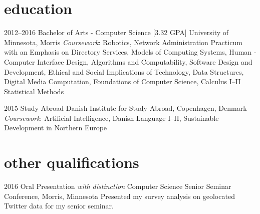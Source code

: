 \documentclass[]{cv-style} %
\begin{document}

\section{education}

\begin{entrylist}


\entry
{2012--2016}
{Bachelor {\normalfont of Arts - Computer Science [3.32 GPA]}}
{University of Minnesota, Morris}
{\emph{Coursework}: \footnotesize{Robotics, Network Administration Practicum with an Emphasis on Directory Services, Models of Computing Systems, Human ­Computer Interface Design, Algorithms and Computability, Software Design and Development, Ethical and Social Implications of Technology, Data Structures, Digital Media Computation, Foundations of Computer Science, Calculus I--II Statistical Methods}}

\entry
{2015}
{Study Abroad}
{Danish Institute for Study Abroad, Copenhagen, Denmark}
{\emph{Coursework}: \footnotesize{Artificial Intelligence, Danish Language I--II, Sustainable Development in Northern Europe}}

\end{entrylist}


\section{other qualifications}

\begin{entrylist}


\entry
{2016}
{Oral Presentation {\normalfont \emph{with distinction}}}
{Computer Science Senior Seminar Conference, Morris, Minnesota}
{Presented my survey analysis on geolocated Twitter data for my senior seminar.}


\end{entrylist}
\end{document}
